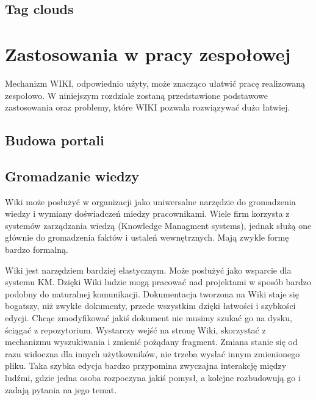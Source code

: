 \documentclass{article}
\begin{document}
	\subsection{Tag clouds}


	

\newpage
\section{Zastosowania w pracy zespołowej}
Mechanizm WIKI, odpowiednio użyty, może znacząco ułatwić pracę realizowaną zespołowo. W niniejszym rozdziale zostaną przedstawione podstawowe zastosowania oraz problemy, które WIKI pozwala rozwiązywać dużo łatwiej. 
	\subsection{Budowa portali}  




	\subsection{Gromadzanie wiedzy}

		Wiki może posłużyć w organizacji jako uniwersalne narzędzie do gromadzenia wiedzy i wymiany doświadczeń miedzy pracownikami. Wiele firm korzysta z systemów zarządzania wiedzą (Knowledge Managment systems), jednak służą one głównie do gromadzenia faktów i ustaleń wewnętrznych. Mają zwykle formę bardzo formalną.

	Wiki jest narzędziem bardziej elastycznym. Może posłużyć jako wsparcie dla systemu KM. Dzięki Wiki ludzie mogą pracować nad projektami w sposób bardzo podobny do naturalnej komunikacji. Dokumentacja tworzona na Wiki staje się bogatszy, niż zwykłe dokumenty, przede wszystkim dzięki łatwości i szybkości edycji. Chcąc zmodyfikować jakiś dokument nie musimy szukać go na dysku, ściągać z repozytorium. Wystarczy wejść na stronę Wiki, skorzystać z mechanizmu wyszukiwania i zmienić pożądany fragment. Zmiana stanie się od razu widoczna dla innych użytkowników, nie trzeba wysłać innym zmienionego pliku. Taka szybka edycja bardzo przypomina zwyczajna interakcję między ludźmi, gdzie jedna osoba rozpoczyna jakiś pomysł, a kolejne rozbudowują go i zadają pytania na jego temat.
\end{document}
